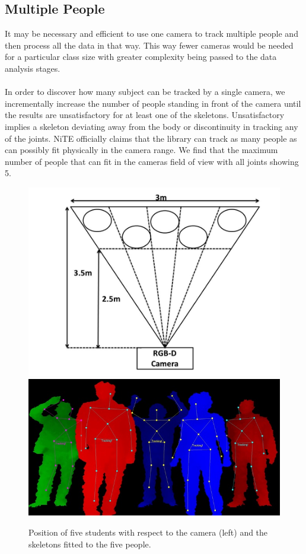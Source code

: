 \documentclass[a4paper]{article}
\begin{document}
\subsection{Multiple People}

\noindent
It may be necessary and efficient to use one camera to track multiple people and then process all the data in that way. This way fewer cameras would be needed for a particular class size with greater complexity being passed to the data analysis stages. \\\\
\noindent
In order to discover how many subject can be tracked by a single camera, we incrementally increase the number of people standing in front of the camera until the results are unsatisfactory for at least one of the skeletons. Unsatisfactory implies a skeleton deviating away from the body or discontinuity in tracking any of the joints. NiTE officially claims that the library can track as many people as can possibly fit physically in the camera range. We find that the maximum number of people that can fit in the cameras field of view with all joints showing 5. \\
 
\begin{figure}[H]
\centering
\includegraphics[scale=0.3]{multi_people1.jpg}
\includegraphics[scale=0.6]{multi_people2.jpg}
\caption{Position of five students with respect to the camera (left) and the skeletons fitted to the five people.}
\label{people_pos}
\end{figure}
\end{document}
